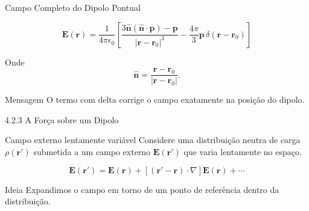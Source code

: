 \documentclass[aspectratio=169]{beamer}
\begin{document}
\begin{frame}{Campo Completo do Dipolo Pontual}

\begin{eqbox}
\begin{equation}
\mathbf E(\mathbf r)
=
\frac{1}{4\pi\epsilon_0}
\left[
\frac{3\hat{\mathbf n}(\hat{\mathbf n}\cdot\mathbf p)-\mathbf p}
{|\mathbf r-\mathbf r_0|^3}
-
\frac{4\pi}{3}\mathbf p\,\delta(\mathbf r-\mathbf r_0)
\right]
\tag{4.16}
\end{equation}
\end{eqbox}

\begin{mybox}{Onde}
\[
\hat{\mathbf n}
=
\frac{\mathbf r-\mathbf r_0}{|\mathbf r-\mathbf r_0|}.
\]
\end{mybox}

\begin{alertblock}{Mensagem}
O termo com delta corrige o campo exatamente na posição do dipolo.
\end{alertblock}

\end{frame}

\begin{frame}{4.2.3 A Força sobre um Dipolo}

\begin{mybox}{Campo externo lentamente variável}
Considere uma distribuição neutra de carga \(\rho(\mathbf r')\) submetida a um campo
externo \(\mathbf E(\mathbf r')\) que varia lentamente no espaço.
\end{mybox}

\begin{eqbox}
\begin{equation}
\mathbf E(\mathbf r')
=
\mathbf E(\mathbf r)
+
[(\mathbf r'-\mathbf r)\cdot\nabla]\mathbf E(\mathbf r)
+\cdots
\tag{4.17}
\end{equation}
\end{eqbox}

\begin{alertblock}{Ideia}
Expandimos o campo em torno de um ponto de referência dentro da distribuição.
\end{alertblock}

\end{frame}
\end{document}
